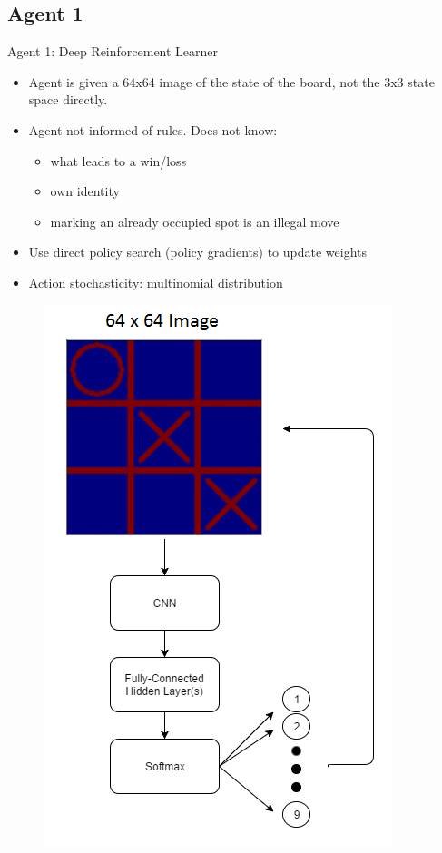 \documentclass[11pt]{beamer}
\begin{document}
	\subsection{Agent 1}
	\begin{frame}{Agent 1: Deep Reinforcement Learner}
		\begin{minipage}[t]{0.55\linewidth}
			\begin{itemize}
				\item Agent is given a 64x64 image of the state of the board, not the 3x3 state space directly.
				\item Agent not informed of rules. Does not know:
				\begin{itemize}
					\item what leads to a win/loss
					\item own identity
					\item marking an already occupied spot is an illegal move
				\end{itemize}
				\item Use direct policy search (policy gradients) to update weights
				\item Action stochasticity: multinomial distribution
			\end{itemize}
		\end{minipage}
		\hfill
		\begin{minipage}[t]{0.4\linewidth}
			\centering
			\begin{figure}[tttDL]
				\centering
				\includegraphics[width=.95\textwidth]{Figures/deeptictactoe.png}

\end{figure}
\end{minipage}
\end{frame}
\end{document}
